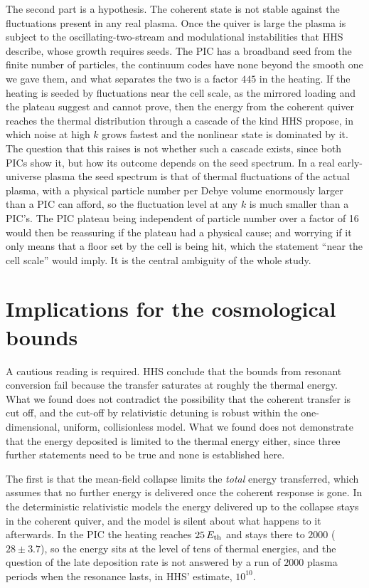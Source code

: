 The second part is a hypothesis. The coherent state is not stable against the fluctuations present in any real plasma. Once the quiver is large the plasma is subject to the oscillating-two-stream and modulational instabilities that HHS describe, whose growth requires seeds. The PIC has a broadband seed from the finite number of particles, the continuum codes have none beyond the smooth one we gave them, and what separates the two is a factor $445$ in the heating. If the heating is seeded by fluctuations near the cell scale, as the mirrored loading and the plateau suggest and cannot prove, then the energy from the coherent quiver reaches the thermal distribution through a cascade of the kind HHS propose, in which noise at high $k$ grows fastest and the nonlinear state is dominated by it. The question that this raises is not whether such a cascade exists, since both PICs show it, but how its outcome depends on the seed spectrum. In a real early-universe plasma the seed spectrum is that of thermal fluctuations of the actual plasma, with a physical particle number per Debye volume enormously larger than a PIC can afford, so the fluctuation level at any $k$ is much smaller than a PIC's. The PIC plateau being independent of particle number over a factor of 16 would then be reassuring if the plateau had a physical cause; and worrying if it only means that a floor set by the cell is being hit, which the statement ``near the cell scale'' would imply. It is the central ambiguity of the whole study.

\section{Implications for the cosmological bounds}

A cautious reading is required. HHS conclude that the bounds from resonant conversion fail because the transfer saturates at roughly the thermal energy. What we found does not contradict the possibility that the coherent transfer is cut off, and the cut-off by relativistic detuning is robust within the one-dimensional, uniform, collisionless model. What we found does not demonstrate that the energy deposited is limited to the thermal energy either, since three further statements need to be true and none is established here.

The first is that the mean-field collapse limits the \emph{total} energy transferred, which assumes that no further energy is delivered once the coherent response is gone. In the deterministic relativistic models the energy delivered up to the collapse stays in the coherent quiver, and the model is silent about what happens to it afterwards. In the PIC the heating reaches $25\,E_{\rm th}$ and stays there to $2000$ ($28\pm3.7$), so the energy sits at the level of tens of thermal energies, and the question of the late deposition rate is not answered by a run of $2000$ plasma periods when the resonance lasts, in HHS' estimate, $10^{10}$.

